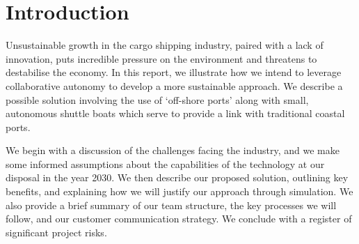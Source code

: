     \section{Introduction}
    Unsustainable growth in the cargo shipping industry, paired with a lack of innovation, puts incredible pressure on the environment and threatens to destabilise the economy. In this report, we illustrate how we intend to leverage collaborative autonomy to develop a more sustainable approach. We describe a possible solution involving the use of `off-shore ports' along with small, autonomous shuttle boats  which serve to provide a link with traditional coastal ports. 
    
    We begin with a discussion of the challenges facing the industry, and we make some informed assumptions about the capabilities of the technology at our disposal in the year 2030. We then describe our proposed solution, outlining key benefits, and explaining how we will justify our approach through simulation. We also provide a brief summary of our team structure, the key processes we will follow, and our customer communication strategy. We conclude with a register of significant project risks.